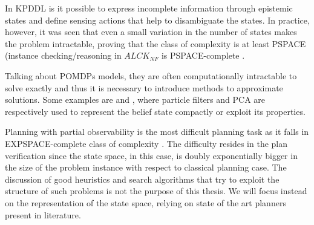\documentclass[pdftex,12pt,a4paper]{report}
\begin{document}
\noindent In KPDDL is it possible to express incomplete information through epistemic states and define sensing actions that help to disambiguate the states. In practice, however, it was seen that even a small variation in the number of states makes the problem intractable, proving that the class of complexity is at least PSPACE (instance checking/reasoning in $ALCK_{NF}$ is PSPACE-complete \cite{donini1997autoepistemic}.%
\newline

\noindent Talking about POMDPs models, they are often computationally intractable to solve exactly and thus it is necessary to introduce methods to approximate solutions. Some examples are \cite{roy2005finding}%
and \cite{brafman2014contingent},%
where particle filters and PCA are respectively used to represent the belief state compactly or exploit its properties.
\newline

\noindent Planning with partial observability is the most difficult planning task as it falls in EXPSPACE-complete class of complexity \cite{rintanen2004complexity}. The difficulty resides in the plan verification since the state space, in this case, is doubly exponentially bigger in the size of the problem instance with respect to classical planning case.
The discussion of good heuristics and search algorithms that try to exploit the structure of such problems is not the purpose of this thesis.
We will focus instead on the representation of the state space, relying on state of the art planners present in literature.
\end{document}
